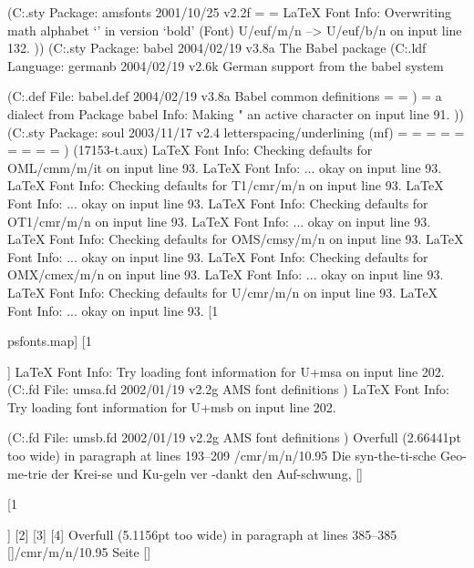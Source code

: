 (C:\texmf\tex\latex\amsfonts\amsfonts.sty
Package: amsfonts 2001/10/25 v2.2f
\symAMSa=
\symAMSb=
LaTeX Font Info:    Overwriting math alphabet `\mathfrak' in version `bold'
(Font)                  U/euf/m/n --> U/euf/b/n on input line 132.
))
(C:\texmf\tex\generic\babel\babel.sty
Package: babel 2004/02/19 v3.8a The Babel package
 (C:\texmf\tex\generic\babel\germanb.ldf
Language: germanb 2004/02/19 v2.6k German support from the babel system

(C:\texmf\tex\generic\babel\babel.def
File: babel.def 2004/02/19 v3.8a Babel common definitions
\babel@savecnt=
\U@D=
)
\l@austrian = a dialect from \language\l@german 
Package babel Info: Making " an active character on input line 91.
)) (C:\texmf\tex\latex\soul\soul.sty
Package: soul 2003/11/17 v2.4 letterspacing/underlining (mf)
\SOUL@word=
\SOUL@lasttoken=
\SOUL@cmds=
\SOUL@buffer=
\SOUL@token=
\SOUL@spaceskip=
\SOUL@ttwidth=
\SOUL@uldp=
\SOUL@ulht=
)
(17153-t.aux)
LaTeX Font Info:    Checking defaults for OML/cmm/m/it on input line 93.
LaTeX Font Info:    ... okay on input line 93.
LaTeX Font Info:    Checking defaults for T1/cmr/m/n on input line 93.
LaTeX Font Info:    ... okay on input line 93.
LaTeX Font Info:    Checking defaults for OT1/cmr/m/n on input line 93.
LaTeX Font Info:    ... okay on input line 93.
LaTeX Font Info:    Checking defaults for OMS/cmsy/m/n on input line 93.
LaTeX Font Info:    ... okay on input line 93.
LaTeX Font Info:    Checking defaults for OMX/cmex/m/n on input line 93.
LaTeX Font Info:    ... okay on input line 93.
LaTeX Font Info:    Checking defaults for U/cmr/m/n on input line 93.
LaTeX Font Info:    ... okay on input line 93.
 [1

{psfonts.map}] [1

]
LaTeX Font Info:    Try loading font information for U+msa on input line 202.
 (C:\texmf\tex\latex\amsfonts\umsa.fd
File: umsa.fd 2002/01/19 v2.2g AMS font definitions
)
LaTeX Font Info:    Try loading font information for U+msb on input line 202.

(C:\texmf\tex\latex\amsfonts\umsb.fd
File: umsb.fd 2002/01/19 v2.2g AMS font definitions
)
Overfull \hbox (2.66441pt too wide) in paragraph at lines 193--209
 /cmr/m/n/10.95 Die syn-the-ti-sche Geo-me-trie der Krei-se und Ku-geln ver
-dankt den Auf-schwung,
 []

[1

] [2] [3] [4]
Overfull \hbox (5.1156pt too wide) in paragraph at lines 385--385
[]/cmr/m/n/10.95 Seite 
 []

